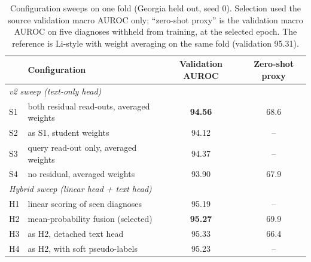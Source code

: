 \begin{table}[!htbp]
\centering\footnotesize
\caption{Configuration sweeps on one fold (Georgia held out, seed 0). Selection used the source validation macro AUROC only; ``zero-shot proxy'' is the validation macro AUROC on five diagnoses withheld from training, at the selected epoch. The reference is Li-style with weight averaging on the same fold (validation 95.31).}\label{tab:sweeps}
\begin{tabular}{llcc}
\toprule
 & Configuration & Validation AUROC & Zero-shot proxy \\
\midrule
\multicolumn{4}{l}{\emph{v2 sweep (text-only head)}} \\
S1 & both residual read-outs, averaged weights & \textbf{94.56} & 68.6 \\
S2 & as S1, student weights & 94.12 & -- \\
S3 & query read-out only, averaged weights & 94.37 & -- \\
S4 & no residual, averaged weights & 93.90 & 67.9 \\
\midrule
\multicolumn{4}{l}{\emph{Hybrid sweep (linear head + text head)}} \\
H1 & linear scoring of seen diagnoses & 95.19 & -- \\
H2 & mean-probability fusion (selected) & \textbf{95.27} & 69.9 \\
H3 & as H2, detached text head & 95.33 & 66.4 \\
H4 & as H2, with soft pseudo-labels & 95.23 & -- \\
\bottomrule
\end{tabular}
\end{table}

